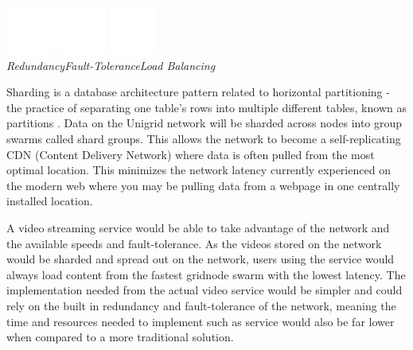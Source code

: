 \documentclass[a4paper,oneside]{article}
\begin{document}
\begin{center}
\vspace{0.1cm}
\includegraphics[width=45pt]{redundancy}
\hspace{1.5cm}
\includegraphics[width=45pt]{tolerance}
\hspace{1.5cm}
\includegraphics[width=45pt]{load-balance}
\\
\vspace{0.12cm}
\hspace{8pt}\emph{Redundancy}\hspace{38pt}\emph{Fault-Tolerance}\hspace{30pt}\emph{Load Balancing}
\end{center}

\noindent Sharding is a database architecture pattern related to horizontal partitioning - the practice of separating one table’s rows into multiple different tables, known as partitions \cite{mark2019}. Data on the Unigrid network will be sharded across nodes into group swarms called shard groups. This allows the network to become a self-replicating CDN (Content Delivery Network) where data is often pulled from the most optimal location. This minimizes the network latency currently experienced on the modern web where you may be pulling data from a webpage in one centrally installed location.

A video streaming service would be able to take advantage of the network and the available speeds and fault-tolerance. As the videos stored on the network would be sharded and spread out on the network, users using the service would always load content from the fastest gridnode swarm with the lowest latency. The implementation needed from the actual video service would be simpler and could rely on the built in redundancy and fault-tolerance of the network, meaning the time and resources needed to implement such as service would also be far lower when compared to a more traditional solution.
\end{document}
